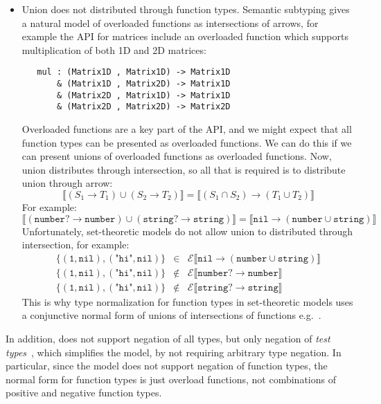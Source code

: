 \documentclass[acmsmall,review,screen]{acmart}
\newcommand{\NIL}{\mathtt{nil}}
\newcommand{\NUMBER}{\mathtt{number}}
\newcommand{\STRING}{\mathtt{string}}
\newcommand{\fun}{\mathbin{\rightarrow}}
\newcommand{\sem}[1]{\llbracket{#1}\rrbracket}
\begin{document}
\begin{itemize}
\item Union does not distributed through function types.
  Semantic subtyping gives a natural model of overloaded functions as intersections of arrows,
  for example the  API for matrices include an overloaded function
  which supports multiplication of both 1D and 2D matrices:
\begin{verbatim}
   mul : (Matrix1D , Matrix1D) -> Matrix1D
       & (Matrix1D , Matrix2D) -> Matrix1D
       & (Matrix2D , Matrix1D) -> Matrix1D
       & (Matrix2D , Matrix2D) -> Matrix2D
\end{verbatim}
  Overloaded functions are a key part of the  API, and we might expect that
  all function types can be presented as overloaded functions. We can do this if we can present
  unions of overloaded functions as overloaded functions. Now, union distributes through intersection,
  so all that is required is to distribute union through arrow:
  \[
    \sem{(S_1 \fun T_1) \cup (S_2 \fun T_2)}
    =
    \sem{(S_1 \cap S_2) \fun (T_1 \cup T_2)}
  \]
  For example:
  \[
    \sem{(\NUMBER? \fun \NUMBER) \cup (\STRING? \fun \STRING)}
    =
    \sem{\NIL \fun (\NUMBER \cup \STRING)}
  \]
  Unfortunately, set-theoretic models do not allow union to distributed through intersection,
  for example:
  \[\begin{array}{rcl}
    \{ (\texttt{1}, \NIL), (\texttt{"hi"}, \NIL) \} & \in & \mathcal{E}\sem{\NIL \fun (\NUMBER \cup \STRING)} \\
    \{ (\texttt{1}, \NIL), (\texttt{"hi"}, \NIL) \} & \not\in & \mathcal{E}\sem{\NUMBER? \fun \NUMBER} \\
    \{ (\texttt{1}, \NIL), (\texttt{"hi"}, \NIL) \} & \not\in & \mathcal{E}\sem{\STRING? \fun \STRING}
  \end{array}\]
  This is why type normalization for function types in set-theoretic models
  uses a conjunctive normal form of unions of intersections of functions e.g.~\cite[\S4.1.2]{Ken21:DownDirty}.
  
\end{itemize}
In addition,  does not support negation of all types, but
only negation of \emph{test types}~\cite{CLNL22:OnTypeCases}, which
simplifies the model, by not requiring arbitrary type negation.  In
particular, since the model does not support negation of function
types, the normal form for function types is just overload functions,
not combinations of positive and negative function types.
\end{document}
